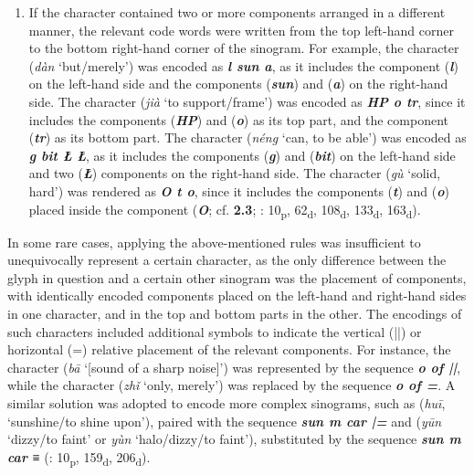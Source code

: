 \documentclass[output=paper,colorlinks,citecolor=brown,arabicfont,chinesefont]{langscibook}
\begin{document}
\begin{enumerate}
    \item If the character contained two or more components arranged in a different manner, the relevant code words were written from the top left-hand corner to the bottom right-hand corner of the sinogram. For example, the character {} (\emph{dàn} ‘but/merely’) was encoded as \textbf{\emph{l sun a}}, as it includes the component {} (\textbf{\emph{l}}) on the left-hand side and the components {} (\textbf{\emph{sun}}) and {} (\textbf{\emph{a}}) on the right-hand side. The character {} (\emph{jià} ‘to support/frame’) was encoded as \textbf{\emph{HP o tr}}, since it includes the components {} (\textbf{\emph{HP}}) and {} (\textbf{\emph{o}}) as its top part, and the component {} (\textbf{\emph{tr}}) as its bottom part. The character {} (\emph{néng} ‘can, to be able’) was encoded as \textbf{\emph{g bit Ł Ł}}, as it includes the components {} (\textbf{\emph{g}}) and {} (\textbf{\emph{bit}}) on the left-hand side and two {} (\textbf{\emph{Ł}}) components on the right-hand side. The character {} (\emph{gù} ‘solid, hard’) was rendered as \textbf{\emph{O t o}}, since it includes the components {} (\textbf{\emph{t}}) and {} (\textbf{\emph{o}}) placed inside the component {} (\textbf{\emph{O}}; cf. \textbf{2.3}; \citealt{Wieluch1936}: 10\textsubscript{p}, 62\textsubscript{d}, 108\textsubscript{d}, 133\textsubscript{d}, 163\textsubscript{d}).
\end{enumerate}

In some rare cases, applying the above-mentioned rules was insufficient to unequivocally represent a certain character, as the only difference between the glyph in question and a certain other sinogram was the placement of components, with identically encoded components placed on the left-hand and right-hand sides in one character, and in the top and bottom parts in the other. The encodings of such characters included additional symbols to indicate the vertical (||) or horizontal (=) relative placement of the relevant components. For instance, the character {} (\emph{bā} ‘[sound of a sharp noise]’) was represented by the sequence \textbf{\emph{o of ||}}, while the character {} (\emph{zhǐ} ‘only, merely’) was replaced by the sequence \textbf{\emph{o of =}}. A similar solution was adopted to encode more complex sinograms, such as {} (\emph{huī}, ‘sunshine/to shine upon’), paired with the sequence \textbf{\emph{sun m car |=}} and {} (\emph{yūn} ‘dizzy/to faint’ or \emph{yùn} ‘halo/dizzy/to faint’), substituted by the sequence \textbf{\emph{sun m car ≡}} (\citealt{Wieluch1936}: 10\textsubscript{p}, 159\textsubscript{d}, 206\textsubscript{d}).
\end{document}
